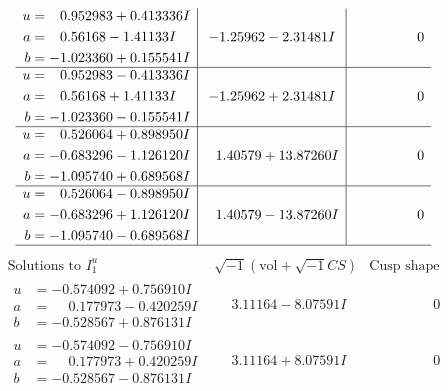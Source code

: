 \documentclass[1p]{elsarticle_modified}
\theoremstyle{definition}
\newcommand{\I}{\sqrt{-1}}
\begin{document}
$$\begin{array}{c|c|c}
\begin{aligned}
u &= \phantom{-}0.952983 + 0.413336 I \\
a &= \phantom{-}0.56168 - 1.41133 I \\
b &= -1.023360 + 0.155541 I\end{aligned}
 & -1.25962 - 2.31481 I & \phantom{-0.000000 } 0 \\ \hline\begin{aligned}
u &= \phantom{-}0.952983 - 0.413336 I \\
a &= \phantom{-}0.56168 + 1.41133 I \\
b &= -1.023360 - 0.155541 I\end{aligned}
 & -1.25962 + 2.31481 I & \phantom{-0.000000 } 0 \\ \hline\begin{aligned}
u &= \phantom{-}0.526064 + 0.898950 I \\
a &= -0.683296 - 1.126120 I \\
b &= -1.095740 + 0.689568 I\end{aligned}
 & \phantom{-}1.40579 + 13.87260 I & \phantom{-0.000000 } 0 \\ \hline\begin{aligned}
u &= \phantom{-}0.526064 - 0.898950 I \\
a &= -0.683296 + 1.126120 I \\
b &= -1.095740 - 0.689568 I\end{aligned}
 & \phantom{-}1.40579 - 13.87260 I & \phantom{-0.000000 } 0\\
 \hline 
 \end{array}$$\newpage$$\begin{array}{c|c|c}  
\text{Solutions to }I^u_{1}& \I (\text{vol} + \sqrt{-1}CS) & \text{Cusp shape}\\
 \hline 
\begin{aligned}
u &= -0.574092 + 0.756910 I \\
a &= \phantom{-}0.177973 - 0.420259 I \\
b &= -0.528567 + 0.876131 I\end{aligned}
 & \phantom{-}3.11164 - 8.07591 I & \phantom{-0.000000 } 0 \\ \hline\begin{aligned}
u &= -0.574092 - 0.756910 I \\
a &= \phantom{-}0.177973 + 0.420259 I \\
b &= -0.528567 - 0.876131 I\end{aligned}
 & \phantom{-}3.11164 + 8.07591 I & \phantom{-0.000000 } 0 \\ \hline\begin{aligned}

\end{aligned}
\end{array}$$
\end{document}
